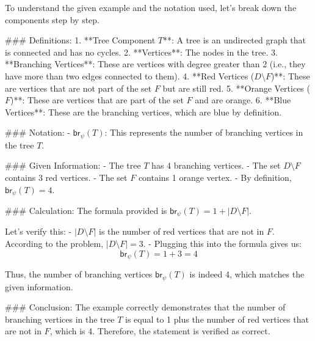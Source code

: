 To understand the given example and the notation used, let's break down the components step by step.

### Definitions:
1. **Tree Component \( T \)**: A tree is an undirected graph that is connected and has no cycles.
2. **Vertices**: The nodes in the tree.
3. **Branching Vertices**: These are vertices with degree greater than 2 (i.e., they have more than two edges connected to them).
4. **Red Vertices (\( D \setminus F \))**: These are vertices that are not part of the set \( F \) but are still red.
5. **Orange Vertices (\( F \))**: These are vertices that are part of the set \( F \) and are orange.
6. **Blue Vertices**: These are the branching vertices, which are blue by definition.

### Notation:
- \( \mathsf{br}_\psi(T) \): This represents the number of branching vertices in the tree \( T \).

### Given Information:
- The tree \( T \) has 4 branching vertices.
- The set \( D \setminus F \) contains 3 red vertices.
- The set \( F \) contains 1 orange vertex.
- By definition, \( \mathsf{br}_\psi(T) = 4 \).

### Calculation:
The formula provided is \( \mathsf{br}_\psi(T) = 1 + |D \setminus F| \).

Let's verify this:
- \( |D \setminus F| \) is the number of red vertices that are not in \( F \). According to the problem, \( |D \setminus F| = 3 \).
- Plugging this into the formula gives us:
  \[
  \mathsf{br}_\psi(T) = 1 + 3 = 4
  \]

Thus, the number of branching vertices \( \mathsf{br}_\psi(T) \) is indeed 4, which matches the given information.

### Conclusion:
The example correctly demonstrates that the number of branching vertices in the tree \( T \) is equal to 1 plus the number of red vertices that are not in \( F \), which is 4. Therefore, the statement is verified as correct.